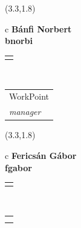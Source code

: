 \documentclass[11pt]{article}
\begin{document}
\makebox(3.3,1.8){
  \renewcommand\arraystretch{1.3}
  \begin{tabular}[c]{c}
    \hspace{8.5mm}
    \LARGE\bf{ Bánfi Norbert }\\
    \hspace{8.5mm}
    \Large{ bnorbi }\\
    \renewcommand\arraystretch{3}
    \begin{tabular}[c]{c}
      \centering
      \fontfamily{phv}\selectfont{
        \textbf{
          \textsc{
            \scriptsize{
            \color{Bright}{ Ismerkedő }\color{Dark}{ Webmester }\color{Dark}{ Sminkmester }\color{Dark}{ Programozó }
            }
          }
        }
      }
    \end{tabular}
    \\
    \renewcommand\arraystretch{1}
    \begin{tabular}{p{3.3in}}
      \hspace{.7cm}WorkPoint\\
      \hspace{.7cm}\emph{ manager }\\
    \end{tabular}
  \end{tabular}
}

\makebox(3.3,1.8){
  \renewcommand\arraystretch{1.3}
  \begin{tabular}[c]{c}
    \hspace{8.5mm}
    \LARGE\bf{ Fericsán Gábor }\\
    \hspace{8.5mm}
    \Large{ fgabor }\\
    \renewcommand\arraystretch{3}
    \begin{tabular}[c]{c}
      \centering
      \fontfamily{phv}\selectfont{
        \textbf{
          \textsc{
            \scriptsize{
            \color{Bright}{ Ismerkedő }\color{Dark}{ Webmester }\color{Bright}{ Sminkmester }\color{Bright}{ Programozó }
            }
          }
        }
      }
    \end{tabular}
    \\
    \renewcommand\arraystretch{1}
    \begin{tabular}{p{3.3in}}
      \hspace{.7cm}\\
      \hspace{.7cm}\emph{  }\\
    \end{tabular}
  \end{tabular}
}
\end{document}
